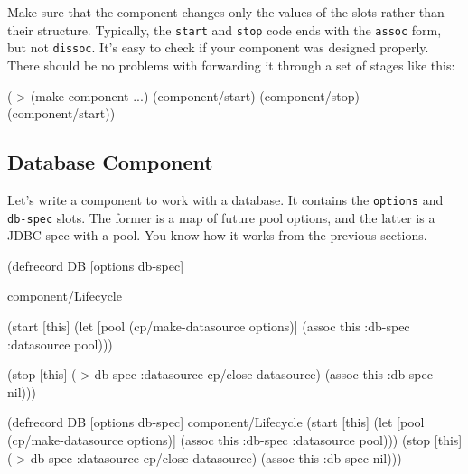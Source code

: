 Make sure that the component changes only the values of the slots rather than their structure. Typically, the \verb|start| and \verb|stop| code ends with the \verb|assoc| form, but not \verb|dissoc|. It's easy to check if your component was designed properly. There should be no problems with forwarding it through a set of stages like this:

\begin{english}
  \begin{clojure}
(-> (make-component {...})
    (component/start)
    (component/stop)
    (component/start))
  \end{clojure}
\end{english}


\subsection{Database Component}

Let's write a component to work with a database. It contains the \verb|options| and \verb|db-spec| slots. The former is a map of future pool options, and the latter is a JDBC spec with a pool. You know how it works from the previous sections.

\ifnarrow

\begin{english}
  \begin{clojure}
(defrecord DB [options db-spec]

  component/Lifecycle

  (start [this]
    (let [pool (cp/make-datasource
                 options)]
      (assoc this :db-spec
        {:datasource pool})))

  (stop [this]
    (-> db-spec
        :datasource
        cp/close-datasource)
    (assoc this :db-spec nil)))
  \end{clojure}
\end{english}

\else

\begin{english}
  \begin{clojure}
(defrecord DB [options db-spec]
  component/Lifecycle
  (start [this]
    (let [pool (cp/make-datasource options)]
      (assoc this :db-spec {:datasource pool})))
  (stop [this]
    (-> db-spec :datasource cp/close-datasource)
    (assoc this :db-spec nil)))
  \end{clojure}
\end{english}


